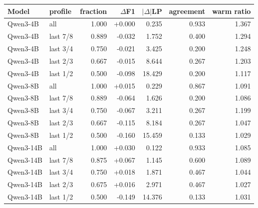 \begin{tabular}{llrrrrr}
\toprule
Model & profile & fraction & $\Delta$F1 & $|\Delta|$LP & agreement & warm ratio \\
\midrule
Qwen3-4B & all & 1.000 & +0.000 & 0.235 & 0.933 & 1.367 \\
Qwen3-4B & last 7/8 & 0.889 & -0.032 & 1.752 & 0.400 & 1.294 \\
Qwen3-4B & last 3/4 & 0.750 & -0.021 & 3.425 & 0.200 & 1.248 \\
Qwen3-4B & last 2/3 & 0.667 & -0.015 & 8.644 & 0.267 & 1.203 \\
Qwen3-4B & last 1/2 & 0.500 & -0.098 & 18.429 & 0.200 & 1.117 \\
Qwen3-8B & all & 1.000 & +0.015 & 0.229 & 0.867 & 1.091 \\
Qwen3-8B & last 7/8 & 0.889 & -0.064 & 1.626 & 0.200 & 1.086 \\
Qwen3-8B & last 3/4 & 0.750 & -0.067 & 3.211 & 0.267 & 1.199 \\
Qwen3-8B & last 2/3 & 0.667 & -0.115 & 8.184 & 0.267 & 1.047 \\
Qwen3-8B & last 1/2 & 0.500 & -0.160 & 15.459 & 0.133 & 1.029 \\
Qwen3-14B & all & 1.000 & +0.030 & 0.122 & 0.933 & 1.085 \\
Qwen3-14B & last 7/8 & 0.875 & +0.067 & 1.145 & 0.600 & 1.089 \\
Qwen3-14B & last 3/4 & 0.750 & +0.018 & 1.871 & 0.467 & 1.044 \\
Qwen3-14B & last 2/3 & 0.675 & +0.016 & 2.971 & 0.467 & 1.027 \\
Qwen3-14B & last 1/2 & 0.500 & -0.149 & 14.376 & 0.133 & 1.031 \\
\bottomrule
\end{tabular}
